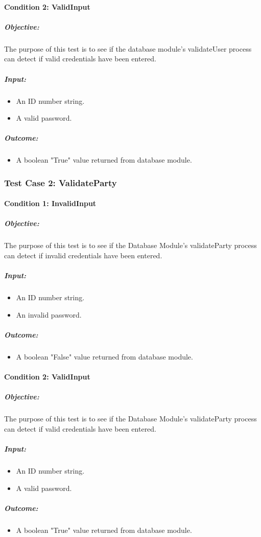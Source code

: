 \documentclass[11pt]{article}
\begin{document}
	\paragraph{Condition 2: ValidInput}	
	\subparagraph{Objective:}
	The purpose of this test is to see if the database module's validateUser process can detect if valid credentials have been entered.
	\subparagraph{Input:}
	\begin{itemize}
		\item An ID number string.
		\item A valid password.
	\end{itemize}
	\subparagraph{Outcome:}
	\begin{itemize}
		\item A boolean "True" value returned from database module.
	\end{itemize}
	
	\subsubsection{Test Case 2: ValidateParty}
	\paragraph{Condition 1: InvalidInput}	
	\subparagraph{Objective:}
	The purpose of this test is to see if the Database Module's validateParty process can detect if invalid credentials have been entered.
	\subparagraph{Input:}
	\begin{itemize}
		\item An ID number string.
		\item An invalid password.
	\end{itemize}
	\subparagraph{Outcome:}
	\begin{itemize}
		\item A boolean "False" value returned from database module.
	\end{itemize}
	
	\paragraph{Condition 2: ValidInput}	
	\subparagraph{Objective:}
	The purpose of this test is to see if the Database Module's validateParty process can detect if valid credentials have been entered.
	\subparagraph{Input:}
	\begin{itemize}
		\item An ID number string.
		\item A valid password.
	\end{itemize}
	\subparagraph{Outcome:}
	\begin{itemize}
		\item A boolean "True" value returned from database module.
	\end{itemize}
	
\end{document}
